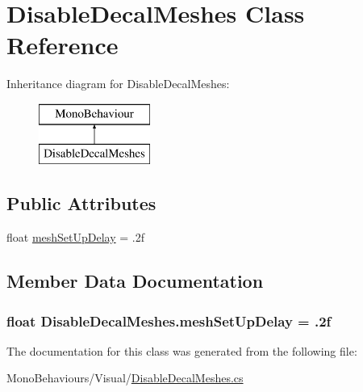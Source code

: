 \hypertarget{class_disable_decal_meshes}{}\section{Disable\+Decal\+Meshes Class Reference}
\label{class_disable_decal_meshes}
Inheritance diagram for Disable\+Decal\+Meshes\+:\begin{figure}[H]
\begin{center}
\leavevmode
\includegraphics[height=2.000000cm]{class_disable_decal_meshes}
\end{center}
\end{figure}
\subsection*{Public Attributes}
\begin{DoxyCompactItemize}
\item 
float \hyperlink{class_disable_decal_meshes_a289f2162be36ac4e9614acd7d243d4ff}{mesh\+Set\+Up\+Delay} = .\+2f
\end{DoxyCompactItemize}


\subsection{Member Data Documentation}
\subsubsection[{\texorpdfstring{mesh\+Set\+Up\+Delay}{meshSetUpDelay}}]{\setlength{\rightskip}{0pt plus 5cm}float Disable\+Decal\+Meshes.\+mesh\+Set\+Up\+Delay = .\+2f}\hypertarget{class_disable_decal_meshes_a289f2162be36ac4e9614acd7d243d4ff}{}\label{class_disable_decal_meshes_a289f2162be36ac4e9614acd7d243d4ff}


The documentation for this class was generated from the following file\+:\begin{DoxyCompactItemize}
\item 
Mono\+Behaviours/\+Visual/\hyperlink{_disable_decal_meshes_8cs}{Disable\+Decal\+Meshes.\+cs}\end{DoxyCompactItemize}
